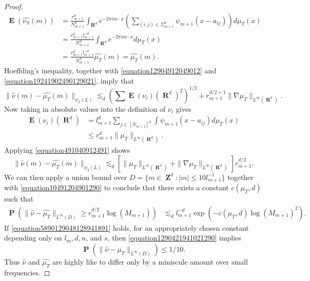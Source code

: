 \documentclass[12pt,reqno]{amsart}
\DeclareMathOperator{\RR}{\mathbf{R}}
\DeclareMathOperator{\ZZ}{\mathbf{Z}}
\DeclareMathOperator{\EE}{\mathbf{E}}
\DeclareMathOperator{\PP}{\mathbf{P}}
\newcommand{\psitwo}[1]{\| {#1} \|_{\psi_2(L)}}
\begin{document}
\begin{proof}
\begin{equation}
\begin{split}
        \EE(\widehat{\nu_S}(m)) &= \frac{r_{m+1}^d}{N_{m+1}^d} \int_{\RR^d} e^{-2 \pi i m \cdot x} \left( \sum_{(i,j) \in \Sigma_{m+1}^d} \psi_{m+1}(x - a_{ij}) \right) d\mu_T(x)\\
        &= \frac{r_{m+1}^d l_{m+1}^{-d}}{N_{m+1}^d} \int_{\RR^d} e^{-2 \pi i m \cdot x} d\mu_T(x)\\
        &= \frac{r_{m+1}^d l_{m+1}^{-d}}{N_{m+1}^d} \widehat{\mu_T}(m) = \widehat{\mu_T}(m).
    \end{split}
    \end{equation}
    Hoeffding's inequality, together with \eqref{equation12904912049012} and \eqref{equation19241902490129021}, imply that
    \[ \psitwo{\widehat{\nu}(m) - \widehat{\mu_T}(m)} \lesssim_d \left( \sum \EE(\nu_i)(\RR^d)^2 \right)^{1/2} + r_{m+1}^{d/2+1} \| \nabla \mu_T \|_{L^\infty(\RR^d)}. \]
    Now taking in absolute values into the definition of $\nu_i$ gives
    \begin{align*}
        \EE(\nu_i)(\RR^d) &= l_{m+1}^d \sum_{j \in [N_{m+1}]^d} \int \psi_{m+1}(x - a_{ij}) d\mu_T(x)\\
        &\leq r_{m+1}^d \| \mu_T \|_{L^\infty(\RR^d)}.
    \end{align*}
    Applying \eqref{equation491040912491} shows 
    \begin{equation} \label{equation10491204901290}
        \psitwo{\widehat{\nu}(m) - \widehat{\mu_T}(m)} \lesssim_d [\| \mu_T \|_{L^\infty(\RR^d)} + \| \nabla \mu_T \|_{L^\infty(\RR^d)}] r_{m+1}^{d/2}.
    \end{equation}
    We can then apply a union bound over $D = \{ m \in \ZZ^d : |m| \leq 10 l_{m+1}^{-1} \}$ together with \eqref{equation10491204901290} to conclude that there exists a constant $c(\mu_T,d)$ such that
    \begin{equation} \label{equation1290421941021290}
    \begin{split}
        \PP \left(\| \widehat{\nu} - \widehat{\mu_T} \|_{L^\infty(D)} \geq r_{m+1}^{d/2} \log(M_{m+1}) \right) &\lesssim_d l_{m+1}^{-d} \exp \left( - c(\mu_T,d) \log(M_{m+1})^2 \right).
    \end{split}
    \end{equation}
    If \eqref{equation5890129048128941891} holds, for an appropriately chosen constant depending only on $l_m, d, n$, and $s$, then \eqref{equation1290421941021290} implies
    \[ \PP \left(\| \widehat{\nu} - \widehat{\mu_T} \|_{L^\infty(D)} \right) \leq 1/10. \]
    Thus $\widehat{\nu}$ and $\widehat{\mu_T}$ are highly like to differ only by a miniscule amount over small frequencies.


\end{proof}
\end{document}
